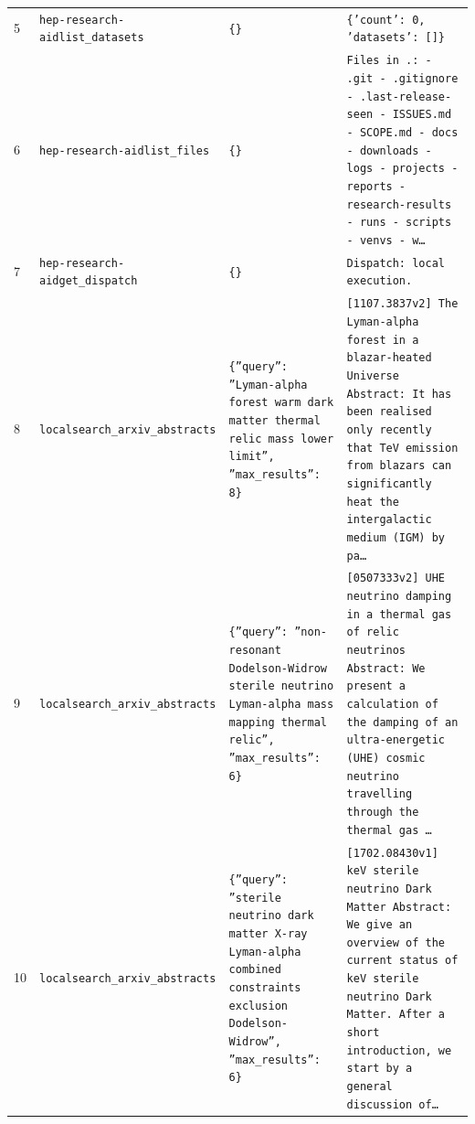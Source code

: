\documentclass[11pt,a4paper]{article}
\begin{document}
\begin{longtable}{@{}p{}p{}p{}p{}@{}}
5 & \texttt{hep-research-aid}\newline\texttt{list\_\allowbreak{}datasets} & \texttt{\{\}\allowbreak{}} & \texttt{\{'count':\allowbreak{} 0,\allowbreak{} 'datasets':\allowbreak{} []\allowbreak{}\}\allowbreak{}} \\
6 & \texttt{hep-research-aid}\newline\texttt{list\_\allowbreak{}files} & \texttt{\{\}\allowbreak{}} & \texttt{Files in .:\allowbreak{}   - .git   - .gitignore   - .last-release-seen   - ISSUES.md   - SCOPE.md   - docs   - downloads   - logs   - projects   - reports   - research-results   - runs   - scripts   - venvs   - w\ldots{}\allowbreak{}} \\
7 & \texttt{hep-research-aid}\newline\texttt{get\_\allowbreak{}dispatch} & \texttt{\{\}\allowbreak{}} & \texttt{Dispatch:\allowbreak{} local execution.} \\
8 & \texttt{local}\newline\texttt{search\_\allowbreak{}arxiv\_\allowbreak{}abstracts} & \texttt{\{''query'':\allowbreak{} ''Lyman-alpha forest warm dark matter thermal relic mass lower limit'',\allowbreak{} ''max\_\allowbreak{}results'':\allowbreak{} 8\}\allowbreak{}} & \texttt{[1107.3837v2]\allowbreak{} The Lyman-alpha forest in a blazar-heated Universe Abstract:\allowbreak{} It has been realised only recently that TeV emission from blazars can significantly heat the intergalactic medium (IGM)\allowbreak{} by pa\ldots{}\allowbreak{}} \\
9 & \texttt{local}\newline\texttt{search\_\allowbreak{}arxiv\_\allowbreak{}abstracts} & \texttt{\{''query'':\allowbreak{} ''non-resonant Dodelson-Widrow sterile neutrino Lyman-alpha mass mapping thermal relic'',\allowbreak{} ''max\_\allowbreak{}results'':\allowbreak{} 6\}\allowbreak{}} & \texttt{[0507333v2]\allowbreak{} UHE neutrino damping in a thermal gas of relic neutrinos Abstract:\allowbreak{}   We present a calculation of the damping of an ultra-energetic (UHE)\allowbreak{} cosmic neutrino travelling through the thermal gas \ldots{}\allowbreak{}} \\
10 & \texttt{local}\newline\texttt{search\_\allowbreak{}arxiv\_\allowbreak{}abstracts} & \texttt{\{''query'':\allowbreak{} ''sterile neutrino dark matter X-ray Lyman-alpha combined constraints exclusion Dodelson-Widrow'',\allowbreak{} ''max\_\allowbreak{}results'':\allowbreak{} 6\}\allowbreak{}} & \texttt{[1702.08430v1]\allowbreak{} keV sterile neutrino Dark Matter Abstract:\allowbreak{} We give an overview of the current status of keV sterile neutrino Dark Matter. After a short introduction,\allowbreak{} we start by a general discussion of\ldots{}\allowbreak{}} \\

\end{longtable}
\end{document}
